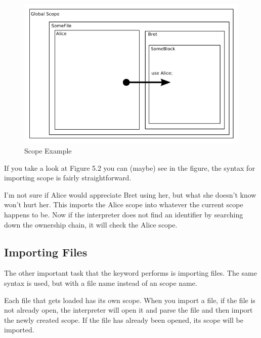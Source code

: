 \begin{figure}[h]
\centering
\includegraphics[width=\linewidth]{graphics/ScopeExample2}
\caption{Scope Example}
\end{figure}

If you take a look at Figure 5.2 you can (maybe) see in the figure, the syntax for importing scope is fairly straightforward.

\begin{SSCodeBox}
\end{SSCodeBox}

I'm not sure if Alice would appreciate Bret using her, but what she doesn't know won't hurt her.  This imports the Alice scope into whatever the current scope happens to be.  Now if the interpreter does not find an identifier by searching down the ownership chain, it will check the Alice scope.

\subsection{Importing Files}

The other important task that the  keyword performs is importing files.  The same syntax is used, but with a file name instead of an scope name.

\begin{SSCodeBox}
\scitea{ }
\scitea{;}
\end{SSCodeBox}

Each file that gets loaded has its own scope.  When you import a file, if the file is not already open, the interpreter will open it and parse the file and then import the newly created scope.  If the file has already been opened, its scope will be imported.

